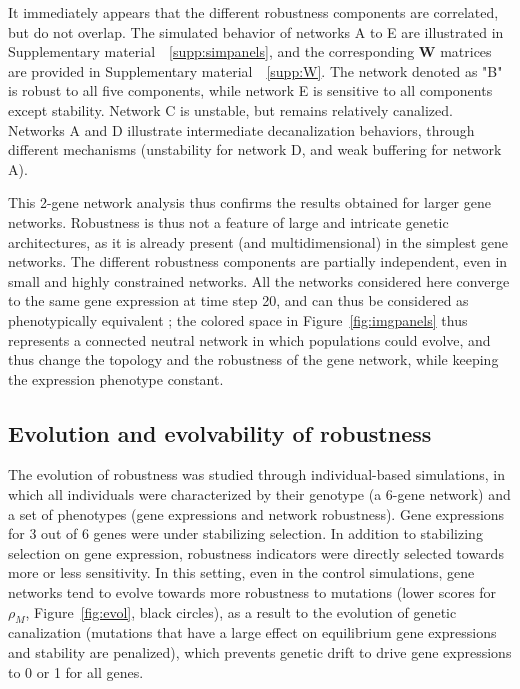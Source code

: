 \documentclass[10pt,a4paper]{article}
\newcommand{\earlymut}{{\rho_M}}
\newcommand{\SupMat}{Supplementary material~}
\begin{document}
It immediately appears that the different robustness components are correlated, but do not overlap. The simulated behavior of networks A to E are illustrated in \SupMat~\ref{supp:simpanels}, and the corresponding $\bm W$ matrices are provided in \SupMat~\ref{supp:W}. The network denoted as "B" is robust to all five components, while network E is sensitive to all components except stability. Network C is unstable, but remains relatively canalized. Networks A and D illustrate intermediate decanalization behaviors, through different mechanisms (unstability for network D, and weak buffering for network A). 

This 2-gene network analysis thus confirms the results obtained for larger gene networks. Robustness is thus not a feature of large and intricate genetic architectures, as it is already present (and multidimensional) in the simplest gene networks. The different robustness components are partially independent, even in small and highly constrained networks. All the networks considered here converge to the same gene expression at time step 20, and can thus be considered as phenotypically equivalent ; the colored space in Figure~\ref{fig:imgpanels} thus represents a connected neutral network in which populations could evolve, and thus change the topology and the robustness of the gene network, while keeping the expression phenotype constant. 

\subsection{Evolution and evolvability of robustness}

The evolution of robustness was studied through individual-based simulations, in which all individuals were characterized by their genotype (a 6-gene network) and a set of phenotypes (gene expressions and network robustness). Gene expressions for 3 out of 6 genes were under stabilizing selection. In addition to stabilizing selection on gene expression, robustness indicators were directly selected towards more or less sensitivity. In this setting, even in the control simulations, gene networks tend to evolve towards more robustness to mutations (lower scores for $\earlymut$, Figure~\ref{fig:evol}, black circles), as a result to the evolution of genetic canalization (mutations that have a large effect on equilibrium gene expressions and stability are penalized), which prevents genetic drift to drive gene expressions to 0 or 1 for all genes. 
\end{document}
